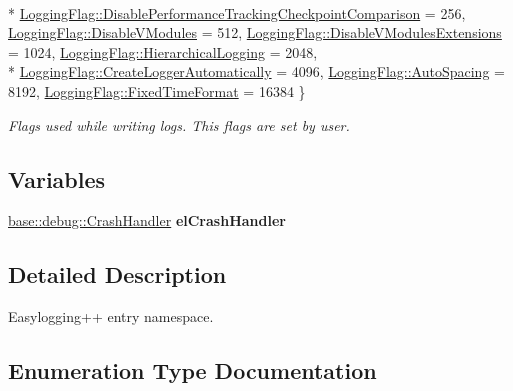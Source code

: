 \begin{DoxyCompactItemize}
\\*
\hyperlink{namespaceel_a2784aacd04cb7816ac1c0b20fcbf83cba18ea5964e8caa7c476dd5eee8e4f74a0}{Logging\+Flag\+::\+Disable\+Performance\+Tracking\+Checkpoint\+Comparison} = 256, 
\hyperlink{namespaceel_a2784aacd04cb7816ac1c0b20fcbf83cba22cae5066e8e0623cb90e20a18abb631}{Logging\+Flag\+::\+Disable\+V\+Modules} = 512, 
\hyperlink{namespaceel_a2784aacd04cb7816ac1c0b20fcbf83cba18a8e65b84ca0cc82451b5e155d7aeb4}{Logging\+Flag\+::\+Disable\+V\+Modules\+Extensions} = 1024, 
\hyperlink{namespaceel_a2784aacd04cb7816ac1c0b20fcbf83cba477de0500d7a5b64a4500d82811fc058}{Logging\+Flag\+::\+Hierarchical\+Logging} = 2048, 
\\*
\hyperlink{namespaceel_a2784aacd04cb7816ac1c0b20fcbf83cba2afa5afe77105aadedcbb90dd8547cc3}{Logging\+Flag\+::\+Create\+Logger\+Automatically} = 4096, 
\hyperlink{namespaceel_a2784aacd04cb7816ac1c0b20fcbf83cba34620f140246d3c3b68c17fdf7b8ada7}{Logging\+Flag\+::\+Auto\+Spacing} = 8192, 
\hyperlink{namespaceel_a2784aacd04cb7816ac1c0b20fcbf83cbaebbb601e28e0cf821dfe13b4a7cf409e}{Logging\+Flag\+::\+Fixed\+Time\+Format} = 16384
 \}\begin{DoxyCompactList}\small\item\em Flags used while writing logs. This flags are set by user. \end{DoxyCompactList}
\end{DoxyCompactItemize}
\subsection*{Variables}
\begin{DoxyCompactItemize}
\item 
\hyperlink{classel_1_1base_1_1debug_1_1CrashHandler}{base\+::debug\+::\+Crash\+Handler} {\bfseries el\+Crash\+Handler}\hypertarget{namespaceel_ab9770514f33aef6683dbba37be2b471d}{}\label{namespaceel_ab9770514f33aef6683dbba37be2b471d}

\end{DoxyCompactItemize}


\subsection{Detailed Description}
Easylogging++ entry namespace. 

\subsection{Enumeration Type Documentation}
